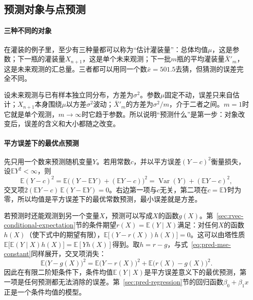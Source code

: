 \subsection{预测对象与点预测}

\paragraph{三种不同的对象}

在灌装的例子里，至少有三种量都可以称为“估计灌装量”：总体均值$\mu$，这是参数；下一瓶的灌装量$X_{n+1}$，这是单个未来观测；下一批$m$瓶的平均灌装量$\bar X'_m$，这是未来观测的汇总量。三者都可以用同一个数$\bar x=501.5$去猜，但猜测的误差完全不同。

设未来观测与已有样本独立同分布，方差为$\sigma^2$。参数$\mu$固定不动，误差只来自估计；$X_{n+1}$本身围绕$\mu$以方差$\sigma^2$波动；$\bar X'_m$的方差为$\sigma^2/m$，介于二者之间。$m=1$时它就是单个观测，$m\to\infty$时它趋于参数。所以说明“预测什么”是第一步：对象改变后，误差的含义和大小都随之改变。

\paragraph{平方误差下的最优点预测}

先只用一个数来预测随机变量$Y$。若用常数$c$，并以平方误差$(Y-c)^2$衡量损失，设$\mathbb E Y^2<\infty$，则
\begin{equation}
 \mathbb E(Y-c)^2=\mathbb E\bigl((Y-\mathbb EY)+(\mathbb EY-c)\bigr)^2=\operatorname{Var}(Y)+(\mathbb EY-c)^2,
 \label{eq:pred-mse-constant}
\end{equation}
交叉项$2(\mathbb EY-c)\,\mathbb E(Y-\mathbb EY)=0$。右边第一项与$c$无关，第二项在$c=\mathbb EY$时为零，所以均值是平方误差下的最优常数预测，最小误差就是方差。

若预测时还能观测到另一个变量$X$，预测可以写成$X$的函数$g(X)$。第~\ref{sec:rvec-conditional-expectation}节的条件期望$r(X)=\mathbb E(Y\mid X)$满足：对任何$X$的函数$h(X)$（使下式中的期望有限），$\mathbb E\bigl[(Y-r(X))h(X)\bigr]=0$。这可以由塔性质$\mathbb E\bigl[\mathbb E(Y\mid X)h(X)\bigr]=\mathbb E[Yh(X)]$得到。取$h=r-g$，与式~\eqref{eq:pred-mse-constant}同样展开，交叉项消失：
\begin{equation}
 \mathbb E\bigl(Y-g(X)\bigr)^2=\mathbb E\bigl(Y-r(X)\bigr)^2+\mathbb E\bigl(r(X)-g(X)\bigr)^2.
 \label{eq:pred-mse-conditional}
\end{equation}
因此在有限二阶矩条件下，条件均值$\mathbb E(Y\mid X)$是平方误差意义下的最优预测，第一项是任何预测都无法消除的误差。第~\ref{sec:pred-regression}节的回归函数$\beta_0+\beta_1x$正是一个条件均值的模型。


